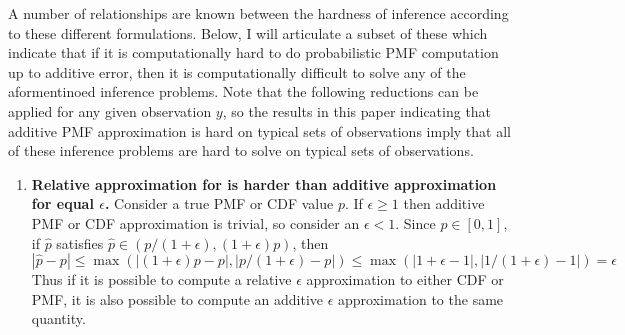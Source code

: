 \documentclass{article}
\theoremstyle{definition}
\theoremstyle{remark}
\begin{document}
A number of relationships are known between the hardness of inference according to these different formulations.
Below, I will articulate a subset of these which indicate that if it is computationally hard to do 
probabilistic PMF computation up to additive error, then it is computationally difficult to solve any of the aformentinoed inference problems.
Note that the following reductions can be applied for any given observation $y$, so the results in this paper indicating that additive PMF approximation is hard on typical sets of observations imply that all of these inference problems are hard to solve on typical sets of observations.

\begin{enumerate}
    \item \textbf{Relative approximation for is harder than additive approximation for equal $\epsilon$.}
    Consider a true PMF or CDF value $p$. If $\epsilon \geq 1$ then additive PMF or CDF approximation is trivial, so consider an $\epsilon < 1$.
    Since $p \in [0, 1]$, if $\hat{p}$ satisfies $\hat{p} \in (p/(1+\epsilon), (1+\epsilon)p)$, then $$|\hat{p} - p| \leq \max(|(1 + \epsilon)p - p|, |p/(1+\epsilon) - p|) \leq \max(|1 + \epsilon - 1|, |1/(1+\epsilon) - 1|) = \epsilon$$
    Thus if it is possible to compute a relative $\epsilon$ approximation to either CDF or PMF, it is also possible to compute an additive $\epsilon$ approximation to the same quantity.


\end{enumerate}
\end{document}
